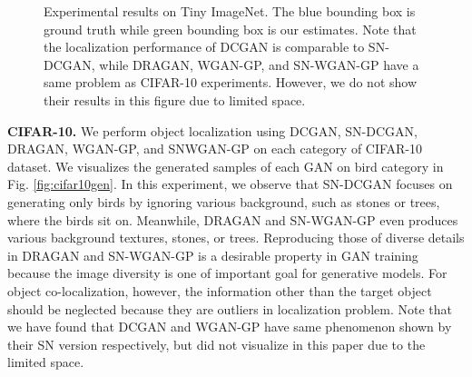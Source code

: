 \documentclass[runningheads]{llncs}
\begin{document}
\begin{figure}[h!]
    \noindent
    \begin{center}
        \vspace*{-1.5mm}
        \vspace*{-1.5mm}
        \vspace*{-1.5mm}
        \vspace*{-1.5mm}
        \vspace*{-1.5mm}
    \end{center}
    \vspace*{-5mm}
    \caption{Experimental results on Tiny ImageNet. The blue bounding box is ground truth while green bounding box is our estimates. Note that the localization performance of DCGAN is comparable to SN-DCGAN, while DRAGAN, WGAN-GP, and SN-WGAN-GP have a same problem as CIFAR-10 experiments. However, we do not show their results in this figure due to limited space.}
\label{fig:colocalization}
\vspace*{-5mm}
\end{figure}

\noindent\textbf{CIFAR-10.} We perform object localization using DCGAN, SN-DCGAN, DRAGAN, WGAN-GP, and SNWGAN-GP on each category of CIFAR-10 dataset. We visualizes the generated samples of each GAN on bird category in Fig. \ref{fig:cifar10gen}. In this experiment, we observe that SN-DCGAN focuses on generating only birds by ignoring various background, such as stones or trees, where the birds sit on. Meanwhile, DRAGAN and SN-WGAN-GP even produces various background textures, stones, or trees. Reproducing those of diverse details in DRAGAN and SN-WGAN-GP is a desirable property in GAN training because the image diversity is one of important goal for generative models. For object co-localization, however, the information other than the target object should be neglected because they are outliers in localization problem. Note that we have found that DCGAN and WGAN-GP have same phenomenon shown by their SN version respectively, but did not visualize in this paper due to the limited space. 
\end{document}

